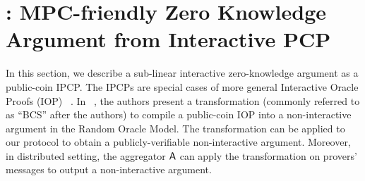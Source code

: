 \section{\name: MPC-friendly Zero Knowledge Argument from Interactive
PCP}\label{sec:graphene}
In this section, we describe a sub-linear interactive zero-knowledge argument as
a public-coin IPCP. The IPCPs are special cases of more
general Interactive Oracle Proofs (IOP) ~\cite{BCS16}. In ~\cite{BCS16}, the
authors present a transformation (commonly referred to as ``BCS'' after the
authors) to compile a public-coin IOP into a non-interactive argument in the
Random Oracle Model. The transformation can be applied to our protocol to obtain
a publicly-verifiable non-interactive argument. Moreover, in distributed
setting, the aggregator $\mathsf{A}$ can apply the transformation on provers' messages
to output a non-interactive argument. 


